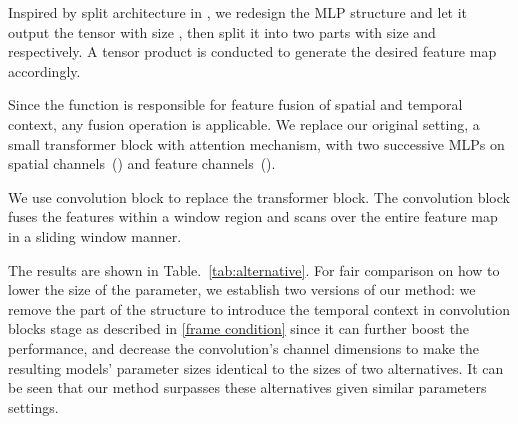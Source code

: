 \documentclass[runningheads]{llncs}
\begin{document}
 Inspired by split architecture in \cite{liang2022coordx}, we redesign the MLP structure and let it output the tensor with size , then split it into two parts with size  and  respectively. A tensor product is conducted to generate the desired  feature map  accordingly.

 Since the function  is responsible for feature fusion of spatial and temporal context, any fusion operation is applicable. We replace our original setting, a small transformer block with attention mechanism, with two successive MLPs on spatial channels~() and feature channels~().

 We use  convolution block to replace the transformer block. The convolution block fuses the features within a window region and scans over the entire feature map in a sliding window manner.

The results are shown in Table.~\ref{tab:alternative}. For fair comparison on how to lower the size of the parameter, we establish two versions of our method: we remove the part of the structure to introduce the temporal context in convolution blocks stage as described in \ref{frame condition} since it can further boost the performance, and decrease the convolution's channel dimensions to make the resulting models' parameter sizes identical to the sizes of two alternatives. It can be seen that our method surpasses these alternatives given similar parameters settings.
\end{document}
